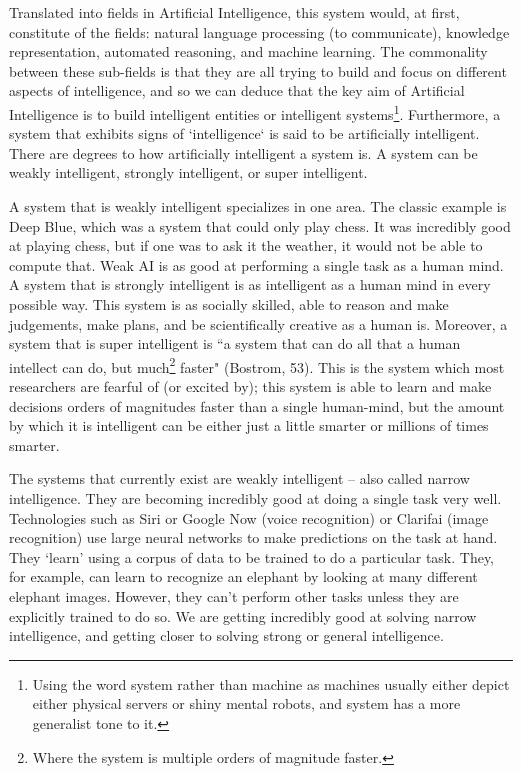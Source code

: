 \documentclass[11pt]{article}
\begin{document}
\par Translated into fields in Artificial Intelligence, this system would, at first, constitute of the fields: natural language processing (to communicate), knowledge representation, automated reasoning, and machine learning. The commonality between these sub-fields is that they are all trying to build and focus on different aspects of intelligence, and so we can deduce that the key aim of Artificial Intelligence is to build intelligent entities or intelligent systems\footnote{Using the word system rather than machine as machines usually either depict either physical servers or shiny mental robots, and system has a more generalist tone to it.}. Furthermore, a system that exhibits signs of `intelligence` is said to be artificially intelligent. There are degrees to how artificially intelligent a system is. A system can be weakly intelligent, strongly intelligent, or super intelligent. 

\par A system that is weakly intelligent specializes in one area. The classic example is Deep Blue, which was a system that could only play chess. It was incredibly good at playing chess, but if one was to ask it the weather, it would not be able to compute that. Weak AI is as good at performing a single task as a human mind. A system that is strongly intelligent is as intelligent as a human mind in every possible way. This system is as socially skilled, able to reason and make judgements, make plans, and be scientifically creative as a human is. Moreover, a system that is super intelligent is ``a system that can do all that a human intellect can do, but much\footnote{Where the system is multiple orders of magnitude faster.} faster" (Bostrom, 53). This is the system which most researchers are fearful of (or excited by); this system is able to learn and make decisions orders of magnitudes faster than a single human-mind, but the amount by which it is intelligent can be either just a little smarter or millions of times smarter.

\par The systems that currently exist are weakly intelligent -- also called narrow intelligence. They are becoming incredibly good at doing a single task very well. Technologies such as Siri or Google Now (voice recognition) or Clarifai (image recognition) use large neural networks to make predictions on the task at hand. They `learn' using a corpus of data to be trained to do a particular task. They, for example, can learn to recognize an elephant by looking at many different elephant images. However, they can't perform other tasks unless they are explicitly trained to do so. We are getting incredibly good at solving narrow intelligence, and getting closer to solving strong or general intelligence.
\end{document}
